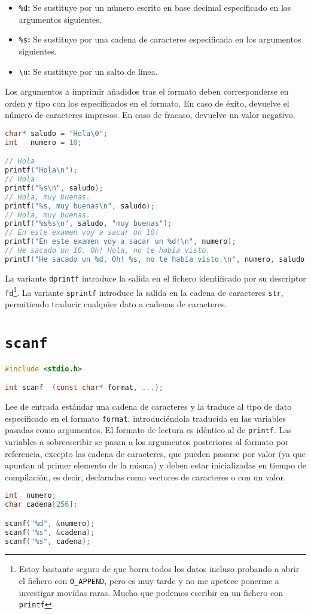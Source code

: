 \begin{itemize}
	\item\texttt{\%d}\textbf{:} Se sustituye por un número escrito en base decimal especificado en los argumentos siguientes.
	\item\texttt{\%s}\textbf{:} Se sustituye por una cadena de caracteres especificada en los argumentos siguientes.
	\item\texttt{\textbackslash{}n}\textbf{:} Se sustituye por un salto de línea.
\end{itemize}

Los argumentos a imprimir añadidos tras el formato deben corresponderse en orden y tipo con los especificados en el formato.
En caso de éxito, devuelve el número de caracteres impresos.
En caso de fracaso, devuelve un valor negativo.

\begin{lstlisting}[language=C]
char* saludo = "Hola\0";
int   numero = 10;

// Hola
printf("Hola\n");
// Hola
printf("%s\n", saludo);
// Hola, muy buenas.
printf("%s, muy buenas\n", saludo);
// Hola, muy buenas.
printf("%s%s\n", saludo, "muy buenas");
// En este examen voy a sacar un 10!
printf("En este examen voy a sacar un %d!\n", numero);
// He sacado un 10. Oh! Hola, no te había visto.
printf("He sacado un %d. Oh! %s, no te había visto.\n", numero, saludo);
\end{lstlisting}

La variante \texttt{dprintf} introduce la salida en el fichero identificado por su descriptor \texttt{fd}\footnote{Estoy bastante seguro de que borra todos los datos incluso probando a abrir el fichero con \texttt{O\_APPEND}, pero es muy tarde y no me apetece ponerme a investigar movidas raras. Mucho que podemos escribir en un fichero con \texttt{printf}}.
La variante \texttt{sprintf} introduce la salida en la cadena de caracteres \texttt{str}, permitiendo traducir cualquier dato a cadenas de caracteres.

\section{\texttt{scanf}}

\begin{lstlisting}[language=C]
#include <stdio.h>

int scanf  (const char* format, ...);
\end{lstlisting}

Lee de entrada estándar una cadena de caracteres y la traduce al tipo de dato especificado en el formato \texttt{format}, introduciéndola traducida en las variables pasadas como argumentos.
El formato de lectura es idéntico al de \texttt{printf}.
Las variables a sobreescribir se pasan a los argumentos posteriores al formato por referencia, excepto las cadena de caracteres, que pueden pasarse por valor (ya que apuntan al primer elemento de la misma) y deben estar inicializadas en tiempo de compilación, es decir, declaradas como vectores de caracteres o con un valor.

\begin{lstlisting}[language=C]
int  numero;
char cadena[256];

scanf("%d", &numero);
scanf("%s", &cadena);
scanf("%s", cadena);
\end{lstlisting}

